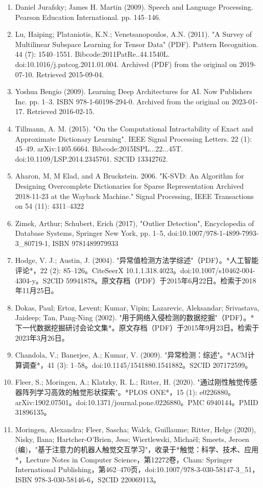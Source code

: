\begin{enumerate}
\item Daniel Jurafsky; James H. Martin (2009). Speech and Language Processing. Pearson Education International. pp. 145–146.
\item Lu, Haiping; Plataniotis, K.N.; Venetsanopoulos, A.N. (2011). "A Survey of Multilinear Subspace Learning for Tensor Data" (PDF). Pattern Recognition. 44 (7): 1540–1551. Bibcode:2011PatRe..44.1540L. doi:10.1016/j.patcog.2011.01.004. Archived (PDF) from the original on 2019-07-10. Retrieved 2015-09-04.
\item Yoshua Bengio (2009). Learning Deep Architectures for AI. Now Publishers Inc. pp. 1–3. ISBN 978-1-60198-294-0. Archived from the original on 2023-01-17. Retrieved 2016-02-15.
\item Tillmann, A. M. (2015). "On the Computational Intractability of Exact and Approximate Dictionary Learning". IEEE Signal Processing Letters. 22 (1): 45–49. arXiv:1405.6664. Bibcode:2015ISPL...22...45T. doi:10.1109/LSP.2014.2345761. S2CID 13342762.
\item Aharon, M, M Elad, and A Bruckstein. 2006. "K-SVD: An Algorithm for Designing Overcomplete Dictionaries for Sparse Representation Archived 2018-11-23 at the Wayback Machine." Signal Processing, IEEE Transactions on 54 (11): 4311–4322
\item Zimek, Arthur; Schubert, Erich (2017), "Outlier Detection", Encyclopedia of Database Systems, Springer New York, pp. 1–5, doi:10.1007/978-1-4899-7993-3_80719-1, ISBN 9781489979933
\item Hodge, V. J.; Austin, J. (2004). "异常值检测方法学综述"（PDF）。*人工智能评论*，22 (2): 85–126。CiteSeerX 10.1.1.318.4023。doi:10.1007/s10462-004-4304-y。S2CID 59941878。原文存档（PDF）于2015年6月22日。检索于2018年11月25日。  
\item Dokas, Paul; Ertoz, Levent; Kumar, Vipin; Lazarevic, Aleksandar; Srivastava, Jaideep; Tan, Pang-Ning (2002). "用于网络入侵检测的数据挖掘"（PDF）。*下一代数据挖掘研讨会论文集*。原文存档（PDF）于2015年9月23日。检索于2023年3月26日。  
\item Chandola, V.; Banerjee, A.; Kumar, V. (2009). "异常检测：综述"。*ACM计算调查*，41 (3): 1–58。doi:10.1145/1541880.1541882。S2CID 207172599。  
\item Fleer, S.; Moringen, A.; Klatzky, R. L.; Ritter, H. (2020). "通过刚性触觉传感器阵列学习高效的触觉形状探索"。*PLOS ONE*，15 (1): e0226880。arXiv:1902.07501。doi:10.1371/journal.pone.0226880。PMC 6940144。PMID 31896135。  
\item Moringen, Alexandra; Fleer, Sascha; Walck, Guillaume; Ritter, Helge (2020), Nisky, Ilana; Hartcher-O'Brien, Jess; Wiertlewski, Michaël; Smeets, Jeroen (编)，"基于注意力的机器人触觉交互学习"，收录于*触觉：科学、技术、应用*，Lecture Notes in Computer Science，第12272卷，Cham: Springer International Publishing，第462–470页，doi:10.1007/978-3-030-58147-3_51，ISBN 978-3-030-58146-6，S2CID 220069113。  

\end{enumerate}
